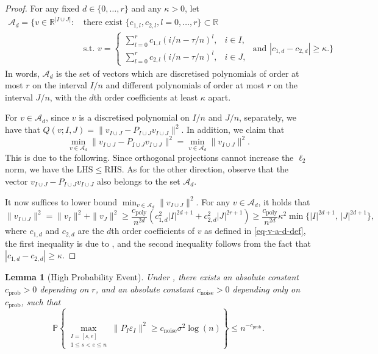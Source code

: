 \documentclass{article}
\newtheorem{lemma}[theorem]{Lemma}
\begin{document}
\begin{proof}
For any fixed $d \in \{0, \ldots, r\}$ and any $\kappa > 0$, let 
	\begin{align}
		\mathcal{A}_d = \Bigg\{v \in \mathbb{R}^{|I \cup J|}: \, & \mbox{there exist } \{c_{1, l}, c_{2, l}, l = 0, \ldots, r\} \subset \mathbb{R} \nonumber \\
		& \mbox{s.t. } v = \begin{cases}
 			\sum_{l = 0}^r c_{1, l} (i/n - \tau/n)^l, & i \in I, \\
 			\sum_{l = 0}^r c_{2, l} (i/n - \tau/n)^l, & i \in J,
 		\end{cases} \mbox{ and } |c_{1, d} - c_{2, d}| \geq \kappa.\Bigg\} \label{eq-v-a-d-def}
	\end{align}
	In words, $\mathcal{A}_d$ is the set of vectors which are discretised polynomials of order at most $r$ on the interval $I/n$ and different polynomials of order at most $r$ on the interval $J/n$, with the $d$th order coefficients at least $\kappa$ apart. 
	
For $v \in \mathcal{A}_d$, since $v$ is a discretised polynomial on $I/n$ and $J/n$, separately, we have that $Q(v; I, J) = \|v_{I \cup J} - P_{I \cup J} v_{I \cup J}\|^2$.  In addition, we claim that
	\[
		\min_{v \in \mathcal{A}_d} \|v_{I \cup J} - P_{I \cup J} v_{I \cup J}\|^2 = \min_{v \in \mathcal{A}_d} \|v_{I \cup J}\|^2.
	\]
	This is due to the following.  Since orthogonal projections cannot increase the $\ell_2$ norm, we have the $\mathrm{LHS} \leq \mathrm{RHS}$.  As for the other direction, observe that the vector $v_{I \cup J} - P_{I \cup J} v_{I \cup J}$ also belongs to the set $\mathcal{A}_d$. 

It now suffices to lower bound $\min_{v \in \mathcal{A}_d} \|v_{I \cup J}\|^2$.  For any $v \in \mathcal{A}_d$, it holds that
	\[
		\|v_{I \cup J}\|^2 = \|v_I\|^2 + \|v_J\|^2 \geq \frac{c_{\mathrm{poly}}}{n^{2d}} \left(c_{1, d}^2 |I|^{2d + 1}  + c_{2, d}^2 |J|^{2r + 1}\right) \geq \frac{c_{\mathrm{poly}}}{n^{2d}} \kappa^2 \min\{|I|^{2d + 1}, \, |J|^{2d + 1}\},
	\]
	where $c_{1, d}$ and $c_{2, d}$ are the $d$th order coefficients of $v$ as defined in \eqref{eq-v-a-d-def}, the first inequality is due to , and the second inequality follows from the fact that $|c_{1, d} - c_{2, d}| \geq \kappa$.
\end{proof}

\begin{lemma}[High Probability Event]\label{lem:noisebd}
Under , there exists an absolute constant $c_{\mathrm{prob}} > 0$ depending on $r$, and an absolute constant $c_{\mathrm{noise}} > 0$ depending only on $c_{\mathrm{prob}}$, such that
	\[
		\mathbb{P}\left\{\max_{\substack{I = [s, e] \\ 1 \leq s < e \leq n}} \|P_I \varepsilon_I\|^2 \geq c_{\mathrm{noise}} \sigma^2 \log(n)\right\} \leq n^{-c_{\mathrm{prob}}}.
	\]
\end{lemma}
\end{document}
